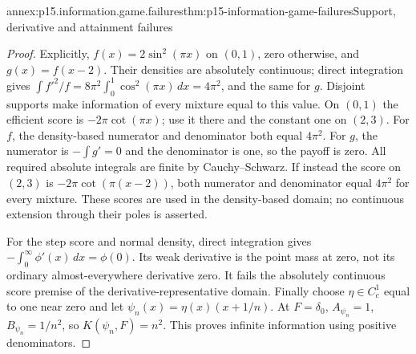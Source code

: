\begin{annexitem}{annex:p15.information.game.failures}{thm:p15-information-game-failures}{Support, derivative and attainment failures}
\begin{proof}
Explicitly, \(f(x)=2\sin^2(\pi x)\) on \((0,1)\), zero otherwise,
and \(g(x)=f(x-2)\). Their densities are absolutely continuous;
direct integration gives
\(\int f'^2/f=8\pi^2\int_0^1\cos^2(\pi x)\,dx=4\pi^2\),
and the same for \(g\).
Disjoint supports make information of every mixture equal to this
value. On \((0,1)\) the efficient score is
\(-2\pi\cot(\pi x)\); use it there and the constant one on \((2,3)\).
For \(f\), the density-based numerator and denominator both equal
\(4\pi^2\). For \(g\), the numerator is
\(-\int g'=0\) and the denominator is one, so the payoff is zero.
All required absolute integrals are finite by Cauchy--Schwarz.
If instead the score on \((2,3)\) is
\(-2\pi\cot(\pi(x-2))\), both numerator and denominator equal
\(4\pi^2\) for every mixture. These scores are used in the
density-based domain; no continuous extension through their poles
is asserted.

For the step score and normal density, direct integration gives
\(-\int_0^\infty\phi'(x)\,dx=\phi(0)\).
Its weak derivative is the point mass at zero, not its ordinary
almost-everywhere derivative zero. It fails the absolutely continuous
score premise of the derivative-representative domain.
Finally choose \(\eta\in C_c^1\) equal to one near zero and let
\(\psi_n(x)=\eta(x)(x+1/n)\). At \(F=\delta_0\),
\(A_{\psi_n}=1\), \(B_{\psi_n}=1/n^2\), so \(K(\psi_n,F)=n^2\).
This proves infinite information using positive denominators.
\end{proof}
\end{annexitem}
